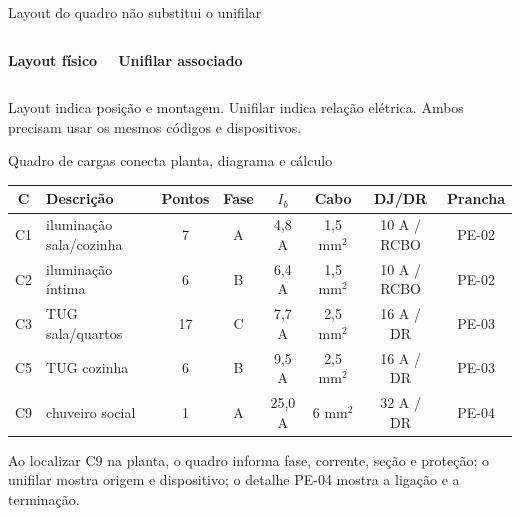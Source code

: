 \begin{frame}{Layout do quadro não substitui o unifilar}
\small
\begin{columns}[T,onlytextwidth]
\centering\textbf{Layout físico}\par\vspace{1mm}
\centering\textbf{Unifilar associado}\par\vspace{1mm}
\end{columns}
\begin{caixaAt}
Layout indica posição e montagem. Unifilar indica relação elétrica. Ambos precisam usar os mesmos códigos e dispositivos.
\end{caixaAt}
\end{frame}

\begin{frame}[shrink=4]{Quadro de cargas conecta planta, diagrama e cálculo}
\scriptsize
\begin{tabularx}{\textwidth}{c X c c c c c c}
\toprule
C & Descrição & Pontos & Fase & $I_b$ & Cabo & DJ/DR & Prancha \\
\midrule
C1 & iluminação sala/cozinha & 7 & A & 4,8 A & 1,5 mm$^2$ & 10 A / RCBO & PE-02 \\
C2 & iluminação íntima & 6 & B & 6,4 A & 1,5 mm$^2$ & 10 A / RCBO & PE-02 \\
C3 & TUG sala/quartos & 17 & C & 7,7 A & 2,5 mm$^2$ & 16 A / DR & PE-03 \\
C5 & TUG cozinha & 6 & B & 9,5 A & 2,5 mm$^2$ & 16 A / DR & PE-03 \\
C9 & chuveiro social & 1 & A & 25,0 A & 6 mm$^2$ & 32 A / DR & PE-04 \\
\bottomrule
\end{tabularx}
\vspace{2mm}
\begin{caixaNorma}
Ao localizar C9 na planta, o quadro informa fase, corrente, seção e proteção; o unifilar mostra origem e dispositivo; o detalhe PE-04 mostra a ligação e a terminação.
\end{caixaNorma}
\end{frame}

